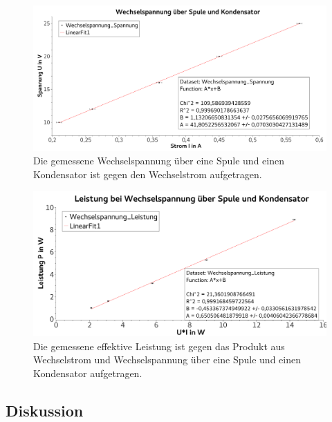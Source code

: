 \documentclass[
	a4paper,
	12pt,
	pagesize,
	ngerman
]{scrartcl}
\begin{document}
	\begin{figure}[tb]
		\includegraphics[width=1\textwidth]{KondensatorSpannungWechsel}
		\centering
		\caption{Die gemessene Wechselspannung über eine Spule und einen Kondensator ist gegen den Wechselstrom aufgetragen.}
		\label{KondesatorSpannungWechsel}
		\centering
	\end{figure}
	\begin{figure}[tb]
		\includegraphics[width=1\textwidth]{KondensatorLeistungWechsel}
		\centering
		\caption{Die gemessene effektive Leistung ist gegen das Produkt aus Wechselstrom und Wechselspannung über eine Spule und einen Kondensator aufgetragen.}
		\label{KondensatorLeistungWechsel}
		\centering
	\end{figure}
	



	




	\subsection{Diskussion}
\end{document}
